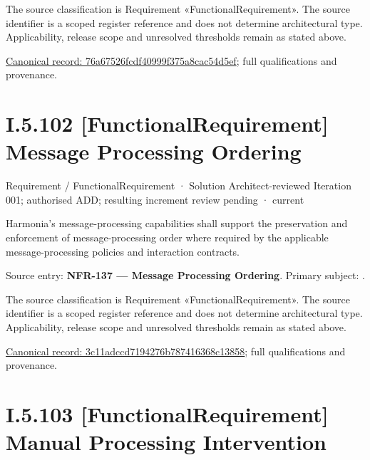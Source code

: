 The source classification is Requirement «FunctionalRequirement». The source identifier is a scoped register reference and does not determine architectural type. Applicability, release scope and unresolved thresholds remain as stated above.


{\footnotesize \href{../../../../../../../../continuum/motivation/requirement/functional-requirement/76a67526fcdf40999f375a8cac54d5ef.md}{Canonical record: 76a67526fcdf40999f375a8cac54d5ef}; full qualifications and provenance.}\par
\section*{I.5.102 [FunctionalRequirement] Message Processing Ordering}
\label{navigation:I.5.102}

\label{element:3c11adccd7194276b787416368c13858}
{\small Requirement / FunctionalRequirement · Solution Architect-reviewed Iteration 001; authorised ADD; resulting increment review pending · current}\par

Harmonia's message-processing capabilities shall support the preservation and enforcement of message-processing order where required by the applicable message-processing policies and interaction contracts.



Source entry: \textbf{NFR-137 — Message Processing Ordering}. Primary subject: \texttt{}.



The source classification is Requirement «FunctionalRequirement». The source identifier is a scoped register reference and does not determine architectural type. Applicability, release scope and unresolved thresholds remain as stated above.


{\footnotesize \href{../../../../../../../../continuum/motivation/requirement/functional-requirement/3c11adccd7194276b787416368c13858.md}{Canonical record: 3c11adccd7194276b787416368c13858}; full qualifications and provenance.}\par
\section*{I.5.103 [FunctionalRequirement] Manual Processing Intervention}
\label{navigation:I.5.103}

